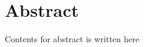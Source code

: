 \section*{\color{red}Abstract}
\setlength{\headheight}{25.28125pt}
Contents for abstract is written here
